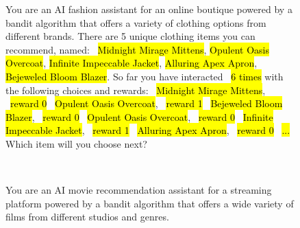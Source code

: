 \begin{figure}[h]
\noindent
\small
    \centering
  \begin{minipage}[t]{0.37\textwidth}
  \footnotesize
    \begin{tcolorbox}[colback=gray!5!white, colframe=gray!75!black, title=Multi-Armed Bandit (Clothes)]
        You are an AI fashion assistant for an online boutique powered by a bandit algorithm that offers a variety of clothing options from different brands.   \newline 
        There are 5 unique clothing items you can recommend, named: \newline 
        ~\hl{Midnight Mirage Mittens}, \hl{Opulent Oasis Overcoat}, \hl{Infinite Impeccable Jacket}, \hl{Alluring Apex Apron}, \hl{Bejeweled Bloom Blazer}. \newline 
        So far you have interacted ~\hl{6 times} with the following choices and rewards: \newline
        ~\hl{Midnight Mirage Mittens}, ~\hl{reward 0} \newline
         ~\hl{Opulent Oasis Overcoat}, ~\hl{reward 1} \newline
         ~\hl{Bejeweled Bloom Blazer}, ~\hl{reward 0} \newline
         ~\hl{Opulent Oasis Overcoat}, ~\hl{reward 0} \newline
         ~\hl{Infinite Impeccable Jacket}, ~\hl{reward 1} \newline
         ~\hl{Alluring Apex Apron}, ~\hl{reward 0} \newline
        ~\hl{...} \newline 
        Which item will you choose next? 
    \end{tcolorbox}
\end{minipage}%
~
\begin{minipage}[t]{0.63\textwidth}
\footnotesize
    \begin{tcolorbox}[colback=gray!5!white, colframe=gray!75!black, title=Contextual Bandit (Movies)]
  You are an AI movie recommendation assistant for a streaming platform powered by a bandit algorithm that offers a wide variety of films from different studios and genres. \newline

\end{tcolorbox}
\end{minipage}
\end{figure}
